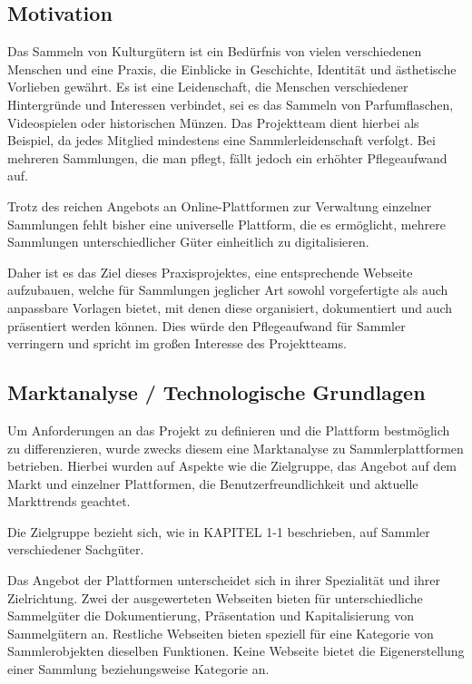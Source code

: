\subsection{Motivation}\label{subsec:Motivation}


Das Sammeln von Kulturgütern ist ein Bedürfnis von vielen verschiedenen Menschen und eine Praxis, die Einblicke in Geschichte, Identität und ästhetische Vorlieben gewährt.
Es ist eine Leidenschaft, die Menschen verschiedener Hintergründe und Interessen verbindet, sei es das Sammeln von Parfumflaschen, Videospielen oder historischen Münzen.
Das Projektteam dient hierbei als Beispiel, da jedes Mitglied mindestens eine Sammlerleidenschaft verfolgt.
Bei mehreren Sammlungen, die man pflegt, fällt jedoch ein erhöhter Pflegeaufwand auf. \par
Trotz des reichen Angebots an Online-Plattformen zur Verwaltung einzelner Sammlungen fehlt bisher eine universelle Plattform, die es ermöglicht, mehrere Sammlungen unterschiedlicher Güter einheitlich zu digitalisieren. \par
Daher ist es das Ziel dieses Praxisprojektes, eine entsprechende Webseite aufzubauen, welche für Sammlungen jeglicher Art sowohl vorgefertigte als auch anpassbare Vorlagen bietet, mit denen diese organisiert, dokumentiert und auch präsentiert werden können.
Dies würde den Pflegeaufwand für Sammler verringern und spricht im großen Interesse des Projektteams.


\subsection{Marktanalyse / Technologische Grundlagen}\label{subsec:Marktanalyse-TechnologischeGrundlagen}

Um Anforderungen an das Projekt zu definieren und die Plattform bestmöglich zu differenzieren, wurde zwecks diesem eine Marktanalyse zu Sammlerplattformen betrieben.
Hierbei wurden auf Aspekte wie die Zielgruppe, das Angebot auf dem Markt und einzelner Plattformen, die Benutzerfreundlichkeit und aktuelle Markttrends geachtet. \par
Die Zielgruppe bezieht sich, wie in KAPITEL 1-1 beschrieben, auf Sammler verschiedener Sachgüter. \linebreak


Das Angebot der Plattformen unterscheidet sich in ihrer Spezialität und ihrer Zielrichtung.
Zwei der ausgewerteten Webseiten bieten für unterschiedliche Sammelgüter die Dokumentierung, Präsentation und Kapitalisierung von Sammelgütern an.
Restliche Webseiten bieten speziell für eine Kategorie von Sammlerobjekten dieselben Funktionen.
Keine Webseite bietet die Eigenerstellung einer Sammlung beziehungsweise Kategorie an. \par

